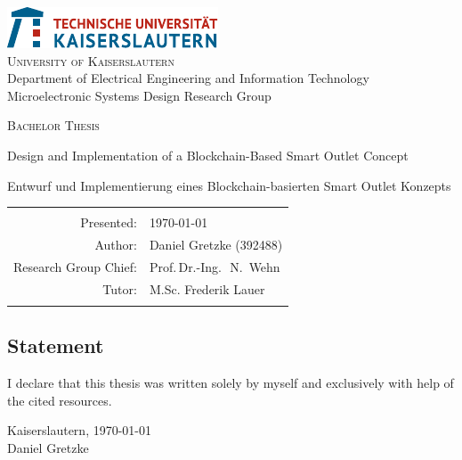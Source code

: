 \begin{titlepage}
\setcounter{page}{-3}
\begin{center}
\includegraphics*[scale=2.5]{img/TUKL_LOGO.pdf}\\[3ex]

\textsc{\Large University of Kaiserslautern}\\[1.5ex]
Department of Electrical Engineering and Information Technology\\[1.5ex]
Microelectronic Systems Design Research Group \\[3ex]

\vfill
\vfill

\textsc{\Huge Bachelor Thesis}\\[6ex]
\centerline{\Large Design and Implementation of a Blockchain-Based Smart Outlet Concept}
\vspace{20pt}
\centerline{\Large Entwurf und Implementierung eines Blockchain-basierten Smart Outlet Konzepts}

\vfill
\vfill

 \begin{tabular}{rl}\hline\\
 Presented:                & \quad \today \\[1.5ex]
 Author:                   & \quad Daniel Gretzke (392488) \\[1.5ex]
 Research Group Chief:     & \quad Prof.\,Dr.-Ing.\,~N.~Wehn\\[1.5ex]
 Tutor:                    & \quad M.Sc. Frederik Lauer\\[1.5ex]\\\hline
 \end{tabular}
\end{center}

    \clearpage
    \pagestyle{empty}
    \begin{flushleft}
    \section*{Statement}
    \vspace{10mm}
    I declare that this thesis was written solely by myself and exclusively with
    help of the cited resources.

    \vspace{12pt}
    Kaiserslautern, \today \\
    \vspace{20mm}
    Daniel Gretzke
    \end{flushleft}

\end{titlepage}

